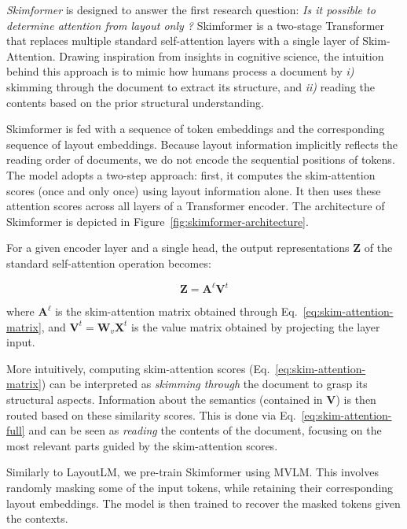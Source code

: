 \emph{Skimformer} is designed to answer the first research question: \textit{Is it possible to determine attention from layout only ?} Skimformer is a two-stage Transformer that replaces multiple standard self-attention layers with a single layer of Skim-Attention. Drawing inspiration from insights in cognitive science, the intuition behind this approach is to mimic how humans process a document by \emph{i)} skimming through the document to extract its structure, and \emph{ii)}  reading the contents based on the prior structural understanding. 

Skimformer is fed with a sequence of token embeddings and the corresponding sequence of layout embeddings. Because layout information implicitly reflects the reading order of documents, we do not encode the sequential positions of tokens. The model adopts a two-step approach: first, it computes the skim-attention scores (once and only once) using layout information alone. It then uses these attention scores across all layers of a Transformer encoder. The architecture of Skimformer is depicted in Figure~\ref{fig:skimformer-architecture}.

For a given encoder layer and a single head, the output representations $\bm{Z}$ of the standard self-attention operation becomes:

\begin{equation}
\label{eq:skim-attention-full}
	\bm{Z} = \bm{A}^{\ell} \bm{V}^{t}
\end{equation}

\noindent where $\bm{A}^{\ell}$ is the skim-attention matrix obtained through Eq.~\ref{eq:skim-attention-matrix}, and $\bm{V}^{t} = \bm{W}_{v} \bm{X}^t$ is the value matrix obtained by projecting the layer input.

More intuitively, computing skim-attention scores (Eq.~\ref{eq:skim-attention-matrix}) can be interpreted as \textit{skimming through} the document to grasp its structural aspects. Information about the semantics (contained in $\bm{V}$) is then routed based on these similarity scores. This is done via Eq.~\ref{eq:skim-attention-full} and can be seen as \textit{reading} the contents of the document, focusing on the most relevant parts guided by the skim-attention scores.

Similarly to LayoutLM, we pre-train Skimformer using \ac{MVLM}. This involves randomly masking some of the input tokens, while retaining their corresponding layout embeddings. The model is then trained to recover the masked tokens given the contexts. 

